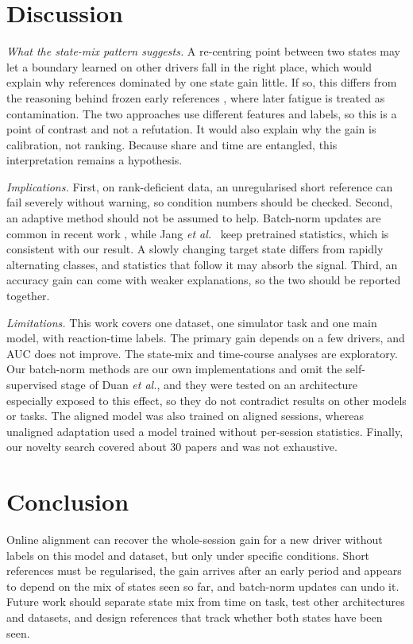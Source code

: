 \section{Discussion}
\label{sec:discussion}

\textit{What the state-mix pattern suggests.} A re-centring point between two states may let a boundary learned on other drivers fall in the right place, which would explain why references dominated by one state gain little. If so, this differs from the reasoning behind frozen early references \cite{gao2026early}, where later fatigue is treated as contamination. The two approaches use different features and labels, so this is a point of contrast and not a refutation. It would also explain why the gain is calibration, not ranking. Because share and time are entangled, this interpretation remains a hypothesis.

\textit{Implications.} First, on rank-deficient data, an unregularised short reference can fail severely without warning, so condition numbers should be checked. Second, an adaptive method should not be assumed to help. Batch-norm updates are common in recent work \cite{wimpff2023calibration,li2026backprop,duan2025online}, while Jang \textit{et al.}~\cite{jang2025calibration} keep pretrained statistics, which is consistent with our result. A slowly changing target state differs from rapidly alternating classes, and statistics that follow it may absorb the signal. Third, an accuracy gain can come with weaker explanations, so the two should be reported together.

\textit{Limitations.} This work covers one dataset, one simulator task and one main model, with reaction-time labels. The primary gain depends on a few drivers, and AUC does not improve. The state-mix and time-course analyses are exploratory. Our batch-norm methods are our own implementations and omit the self-supervised stage of Duan \textit{et al.}, and they were tested on an architecture especially exposed to this effect, so they do not contradict results on other models or tasks. The aligned model was also trained on aligned sessions, whereas unaligned adaptation used a model trained without per-session statistics. Finally, our novelty search covered about 30 papers and was not exhaustive.

\section{Conclusion}
\label{sec:conclusion}

Online alignment can recover the whole-session gain for a new driver without labels on this model and dataset, but only under specific conditions. Short references must be regularised, the gain arrives after an early period and appears to depend on the mix of states seen so far, and batch-norm updates can undo it. Future work should separate state mix from time on task, test other architectures and datasets, and design references that track whether both states have been seen.
